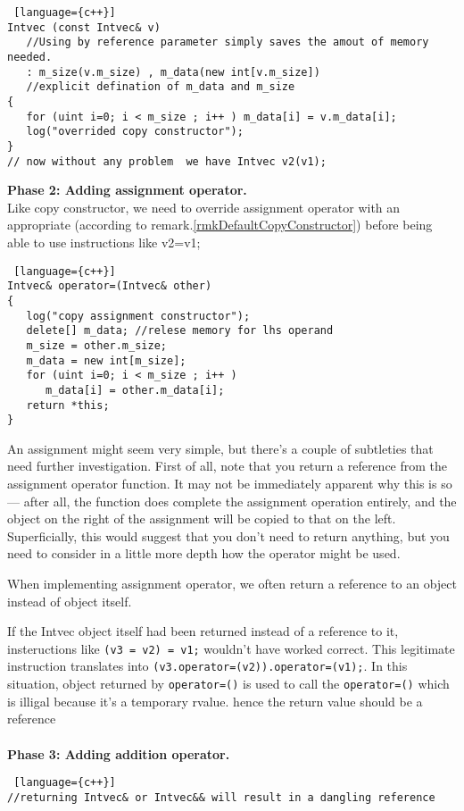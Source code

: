 \begin{note}
\begin{lstlisting} [language={c++}]
Intvec (const Intvec& v)
   //Using by reference parameter simply saves the amout of memory needed.
   : m_size(v.m_size) , m_data(new int[v.m_size])
   //explicit defination of m_data and m_size 
{
   for (uint i=0; i < m_size ; i++ ) m_data[i] = v.m_data[i];
   log("overrided copy constructor");
}
// now without any problem  we have Intvec v2(v1);
\end{lstlisting}
\textbf{Phase 2: Adding assignment operator.}\\
Like copy constructor, we need to override assignment operator with an appropriate (according to remark.\ref{rmkDefaultCopyConstructor}) before being able to use instructions like v2=v1;
\begin{lstlisting} [language={c++}]
Intvec& operator=(Intvec& other)
{
   log("copy assignment constructor");
   delete[] m_data; //relese memory for lhs operand
   m_size = other.m_size;
   m_data = new int[m_size];
   for (uint i=0; i < m_size ; i++ )
      m_data[i] = other.m_data[i];
   return *this;
}
\end{lstlisting}
An assignment might seem very simple, but there’s a couple of subtleties that need further
investigation. First of all, note that you return a reference from the assignment operator function. It may not be immediately apparent why this is so — after all, the function does complete the assignment operation entirely, and the object on the right of the assignment will be copied to that on the left. Superficially, this would suggest that you don’t need to return anything, but you need to consider in a little more depth how the operator might be used.
\begin{remark}
	When implementing assignment operator, we often return a reference to an object instead of object itself.
\end{remark}
If the Intvec object itself had been returned instead of a reference to it, insteructions like \verb|(v3 = v2) = v1;| wouldn't have worked correct. This legitimate instruction translates into \verb|(v3.operator=(v2)).operator=(v1);|. In this situation, object returned by \verb|operator=()| is used to call the \verb|operator=()| which is illigal because it's a temporary rvalue. hence the return value should be a reference\\ \\
\textbf{Phase 3: Adding addition operator.}
\begin{lstlisting} [language={c++}]
//returning Intvec& or Intvec&& will result in a dangling reference

\end{lstlisting}
\end{note}
